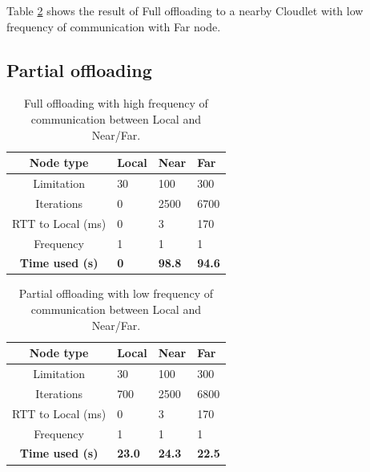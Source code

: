Table \ref{tab:Cloudlet_full_offloading_low_frequency} shows the result of Full offloading to a nearby Cloudlet with low frequency of communication with Far node.







\subsection{Partial offloading}
\begin{table}[h!]
    \centering
    \begin{tabular}[c]{|c||p{2cm}|p{2cm}|p{2cm}|}
        \hline
        Node type & Local & Near & Far \\
        \hline
        Limitation          & 30 & 100 & 300  \\
        \hline
        Iterations          & 0 & 2500 & 6700  \\
        \hline
        RTT to Local (ms)   & 0 & 3 & 170 \\
        \hline
        Frequency           & 1 & 1 & 1 \\
        \hline
        \hline
        \hline
        \textbf{Time used (s)}       & \textbf{0} & \textbf{98.8} & \textbf{94.6} \\
        \hline
    \end{tabular}
    \caption{Full offloading with high frequency of communication between Local and Near/Far.}
    \label{tab:Cloudlet_full_offloading_high_frequency}
\end{table}






\begin{table}[h!]
    \centering
    \begin{tabular}[c]{|c||p{2cm}|p{2cm}|p{2cm}|}
        \hline
        Node type & Local & Near & Far \\
        \hline
        Limitation          & 30 & 100 & 300  \\
        \hline
        Iterations          & 700 & 2500 & 6800 \\
        \hline
        RTT to Local (ms)   & 0 & 3 & 170 \\
        \hline
        Frequency           & 1 & 1 & 1 \\
        \hline
        \hline
        \hline
        \textbf{Time used (s)}       & \textbf{23.0} & \textbf{24.3} & \textbf{22.5} \\
        \hline
    \end{tabular}
    \caption{Partial offloading with low frequency of communication between Local and Near/Far.}
    \label{tab:Cloudlet_full_offloading_low_frequency}
\end{table}




